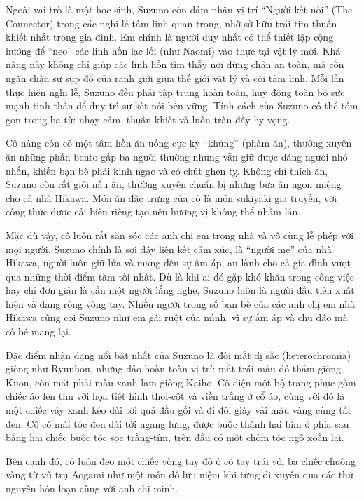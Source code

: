 \documentclass[../main.tex]{subfiles}
\begin{document}

Ngoài vai trò là một học sinh, Suzuno còn đảm nhận vị trí ``Người kết nối'' (The Connector) trong các nghi lễ tâm linh quan trọng, nhờ sở hữu trái tim thuần khiết nhất trong gia đình. Em chính là người duy nhất có thể thiết lập cộng hưởng để ``neo'' các linh hồn lạc lối (như Naomi) vào thực tại vật lý mới. Khả năng này không chỉ giúp các linh hồn tìm thấy nơi dừng chân an toàn, mà còn ngăn chặn sự sụp đổ của ranh giới giữa thế giới vật lý và cõi tâm linh. Mỗi lần thực hiện nghi lễ, Suzuno đều phải tập trung hoàn toàn, huy động toàn bộ sức mạnh tinh thần để duy trì sự kết nối bền vững. Tính cách của Suzuno có thể tóm gọn trong ba từ: nhạy cảm, thuần khiết và luôn tràn đầy hy vọng.

Cô nàng còn có một tâm hồn ăn uống cực kỳ ``khủng'' (phàm ăn), thường xuyên ăn những phần bento gấp ba người thường nhưng vẫn giữ được dáng người nhỏ nhắn, khiến bạn bè phải kinh ngạc và có chút ghen tỵ. Không chỉ thích ăn, Suzuno còn rất giỏi nấu ăn, thường xuyên chuẩn bị những bữa ăn ngon miệng cho cả nhà Hikawa. Món ăn đặc trưng của cô là món sukiyaki gia truyền, với công thức được cải biến riêng tạo nên hương vị không thể nhầm lẫn.

Mặc dù vậy, cô luôn rất săn sóc các anh chị em trong nhà và vô cùng lễ phép với mọi người. Suzuno chính là sợi dây liên kết cảm xúc, là ``người mẹ'' của nhà Hikawa, người luôn giữ lửa và mang đến sự ấm áp, an lành cho cả gia đình vượt qua những thời điểm tăm tối nhất. Dù là khi ai đó gặp khó khăn trong công việc hay chỉ đơn giản là cần một người lắng nghe, Suzuno luôn là người đầu tiên xuất hiện và dang rộng vòng tay. Nhiều người trong số bạn bè của các anh chị em nhà Hikawa cũng coi Suzuno như em gái ruột của mình, vì sự ấm áp và chu đáo mà cô bé mang lại.

Đặc điểm nhận dạng nổi bật nhất của Suzuno là đôi mắt dị sắc (heterochromia) giống như Ryuuhou, nhưng đảo hoàn toàn vị trí: mắt trái màu đỏ thẫm giống Kuon, còn mắt phải màu xanh lam giống Kaiho. Cô diện một bộ trang phục gồm chiếc áo len tím với họa tiết hình thoi-cột và viền trắng ở cổ áo, cùng với đó là một chiếc váy xanh kéo dài tới quá đầu gối và đi đôi giày vải màu vàng cùng tất đen. Cô có mái tóc đen dài tới ngang lưng, được buộc thành hai bím ở phía sau bằng hai chiếc buộc tóc sọc trắng-tím, trên đầu có một chỏm tóc ngố xoắn lại.

Bên cạnh đó, cô luôn đeo một chiếc vòng tay đỏ ở cổ tay trái với ba chiếc chuông vàng từ vũ trụ Aogami như một món đồ lưu niệm khi từng đi xuyên qua các thứ nguyên hỗn loạn cùng với anh chị mình.
\end{document}
